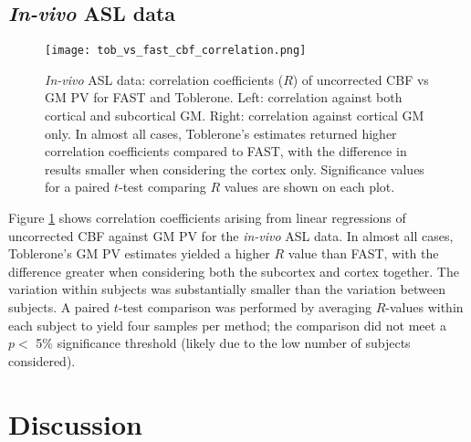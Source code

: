 \subsection{\textit{In-vivo} ASL data}

\begin{figure}[H]
\centering
\texttt{[image: tob\_vs\_fast\_cbf\_correlation.png]}
\caption{\textit{In-vivo} ASL data: correlation coefficients ($R$) of uncorrected CBF vs GM PV for FAST and Toblerone. Left: correlation against both cortical and subcortical GM. Right: correlation against cortical GM only. In almost all cases, Toblerone's estimates returned higher correlation coefficients compared to FAST, with the difference in results smaller when considering the cortex only. Significance values for a paired $t$-test comparing $R$ values are shown on each plot. }
\label{tob_vs_fast_cbf_correlation}
\end{figure}

Figure \ref{tob_vs_fast_cbf_correlation} shows correlation coefficients arising from linear regressions of uncorrected CBF against GM PV for the \textit{in-vivo} ASL data. In almost all cases, Toblerone's GM PV estimates yielded a higher $R$ value than FAST, with the difference greater when considering both the subcortex and cortex together. The variation within subjects was substantially smaller than the variation between subjects. A paired $t$-test comparison was performed by averaging $R$-values within each subject to yield four samples per method; the comparison did not meet a $p <$ 5\% significance threshold (likely due to the low number of subjects considered). 

\section{Discussion}

